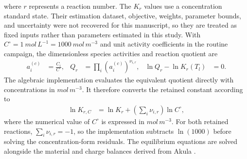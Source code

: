                  where $r$ represents a reaction number. The $K_r$ values use a concentration standard state. Their estimation dataset, objective, weights, parameter bounds, and uncertainty were not recovered for this manuscript, so they are treated as fixed inputs rather than parameters estimated in this study. With $C^\circ=\SI{1}{mol\,L^{-1}}=\SI{1000}{mol\,m^{-3}}$ and unit activity coefficients in the routine campaign, the dimensionless species activities and reaction quotient are
                 \begin{align}
                     a_i^{(c)} &= \frac{C_i}{C^\circ},
                     & Q_r &= \prod_i \left(a_i^{(c)}\right)^{\nu_{i,r}},
                     & \ln Q_r-\ln K_r(T_l) &= 0 .
                 \end{align}
                The algebraic implementation evaluates the equivalent quotient directly with concentrations in \(\unit{mol\,m^{-3}}\). It therefore converts the retained constant according to
                \begin{align}
                    \ln K_{r,C} &= \ln K_r + \left(\sum_i\nu_{i,r}\right)\ln C^\circ ,
                \end{align}
                where the numerical value of $C^\circ$ is expressed in \(\unit{mol\,m^{-3}}\). For both retained reactions, $\sum_i\nu_{i,r}=-1$, so the implementation subtracts $\ln(1000)$ before solving the concentration-form residuals. The equilibrium equations are solved alongside the material and charge balances derived from Akula \cite{Akula2023}.

